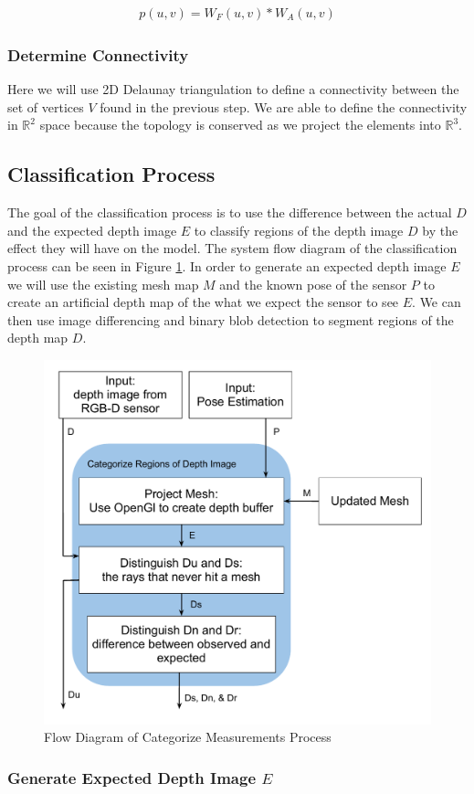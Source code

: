 \documentclass[12pt]{article}
\begin{document}
\begin{align}
p(u,v) = W_F(u,v)*W_A(u,v)
\label{eqn:vpr}
\end{align}

\subsubsection{Determine Connectivity}

Here we will use 2D Delaunay triangulation to define a connectivity
between the set of vertices $V$ found in the previous step. We are able
to define the connectivity in $\scriptstyle{\mathbb{R}}^2$ space because
the topology is conserved as we project the elements into
$\scriptstyle{\mathbb{R}}^3$.


\subsection{Classification Process}

The goal of the classification process is to use the difference between the
actual $D$ and the expected depth image $E$ to classify regions of the
depth image $D$ by the effect they will have on the model. The system flow
diagram of the classification process can be seen in Figure
\ref{fig:SD_CM}. In order to generate an expected depth image $E$ we will
use the existing mesh map $M$ and the known pose of the sensor $P$ to
create an artificial depth map of the what we expect the sensor to see $E$.
We can then use image differencing and binary blob detection to segment
regions of the depth map $D$.  

\begin{figure}[h]
  \centering
    \includegraphics[height=0.4\textwidth]{SD_CM.pdf}
  \caption{Flow Diagram of Categorize Measurements Process}
  \label{fig:SD_CM}
\end{figure}

\subsubsection{Generate Expected Depth Image $E$}
\end{document}

